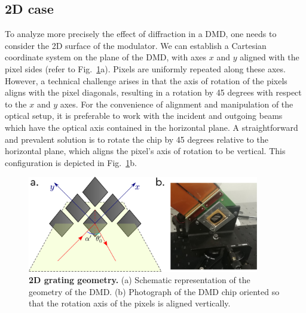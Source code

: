 \documentclass[12pt]{iopart}
\begin{document}


\subsection{2D case}

To analyze more precisely the effect of diffraction in a DMD,
one needs to consider the 2D surface of the modulator.
We can establish a Cartesian coordinate system on the plane of the DMD,
with axes $x$ and $y$ aligned with the pixel sides
(refer to Fig.~\ref{fig:2d_geom}a).
Pixels are uniformly repeated along these axes.
However, a technical challenge arises
in that the axis of rotation of the pixels
aligns with the pixel diagonals,
resulting in a rotation by 45 degrees with respect to the $x$ and $y$ axes.
For the convenience of alignment and manipulation of the optical setup,
it is preferable to work with the incident and outgoing beams
which have the optical axis contained in the horizontal plane.
A straightforward and prevalent solution is to rotate the chip by 45 degrees
relative to the horizontal plane,
which aligns the pixel’s axis of rotation to be vertical.
This configuration is depicted in Fig.~\ref{fig:2d_geom}b.



\begin{figure}
  \centering
  \includegraphics[width = 0.9\textwidth]{images/dmd_45.pdf}
  \caption{
    \textbf{2D grating geometry.}
    (a) Schematic representation of the geometry of the DMD.
    (b) Photograph of the DMD chip oriented so that the rotation axis of the pixels
    is aligned vertically.
  }
  \label{fig:2d_geom}
\end{figure}
\end{document}
